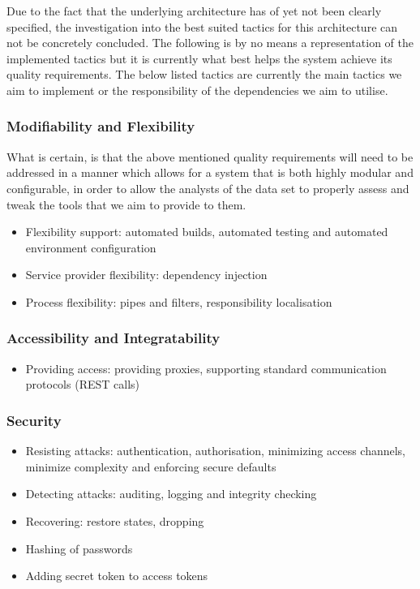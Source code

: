 \documentclass{article}
\begin{document}
	Due to the fact that the underlying architecture has of yet not been clearly specified, the investigation into the best suited tactics for this architecture can not be concretely concluded. The following is by no means a representation of the implemented tactics but it is currently what best helps the system achieve its quality requirements. The below listed tactics are currently the main tactics we aim to implement or the responsibility of the dependencies we aim to utilise.
	
		\subsubsection{Modifiability and Flexibility}
		What is certain, is that the above mentioned quality requirements will need to be addressed in a manner which allows for a system that is both highly modular and configurable, in order to allow the analysts of the data set to properly assess and tweak the tools that we aim to provide to them. 

		\begin{itemize}
			\item Flexibility support: automated builds, automated testing and automated environment configuration
			\item Service provider flexibility: dependency injection
			\item Process flexibility: pipes and filters, responsibility localisation
		\end{itemize}

		\subsubsection{Accessibility and Integratability}
		\begin{itemize}
			\item Providing access: providing proxies, supporting standard communication protocols (REST calls)
		\end{itemize}

		\subsubsection{Security}
		\begin{itemize}
			\item Resisting attacks: authentication, authorisation, minimizing access channels, minimize complexity and enforcing secure defaults
			\item Detecting attacks: auditing, logging and integrity checking
			\item Recovering: restore states, dropping
			\item Hashing of passwords
			\item Adding secret token to access tokens
		\end{itemize}
\end{document}
